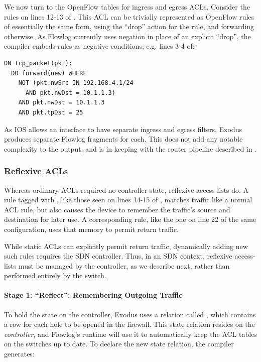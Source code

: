We now turn to the OpenFlow tables for ingress and egress ACLs.
Consider the rules on lines 12-13 of .
This ACL can be trivially represented as OpenFlow rules of essentially the
same form, using the ``drop'' action for the  rule, and forwarding
otherwise. As
Flowlog currently uses negation in place of an explicit ``drop'', the compiler
embeds  rules as negative conditions; e.g. lines 3-4 of:
\begin{lstlisting}[label=lst:flowlog-filter,language=Flowlog]
ON tcp_packet(pkt): 
  DO forward(new) WHERE
    NOT (pkt.nwSrc IN 192.168.4.1/24
      AND pkt.nwDst = 10.1.1.3)
    AND pkt.nwDst = 10.1.1.3 
    AND pkt.tpDst = 25
\end{lstlisting}

\noindent
As IOS allows an interface to have separate ingress and egress
filters, Exodus produces separate Flowlog fragments for
each. This does not add any notable complexity to the output, and is
in keeping with the router pipeline described in .

\subsubsection{Reflexive ACLs}

Whereas ordinary ACLs required no controller state, reflexive
access-lists do. A rule tagged with , like those seen on
lines 14-15 of , matches traffic like a
normal ACL rule, but also causes the device to remember the traffic's
source and destination for later use. A corresponding 
rule, like the one on line 22 of the same configuration, uses that
memory to permit return traffic.

While static ACLs can explicitly permit return traffic, dynamically adding new
such rules requires the SDN controller. Thus, in an SDN
context, reflexive access-lists must be managed by the controller, as we describe next,
rather than performed entirely by the switch.

\paragraph{Stage 1: ``Reflect'': Remembering Outgoing Traffic}

To hold the state on the controller, Exodus uses a
relation called , which contains a row for each
hole to be opened in the firewall. This state relation 
resides on the \emph{controller}, and Flowlog's runtime will use it to
automatically keep the ACL tables on the switches up to date. To declare
the new state relation, the compiler generates:

